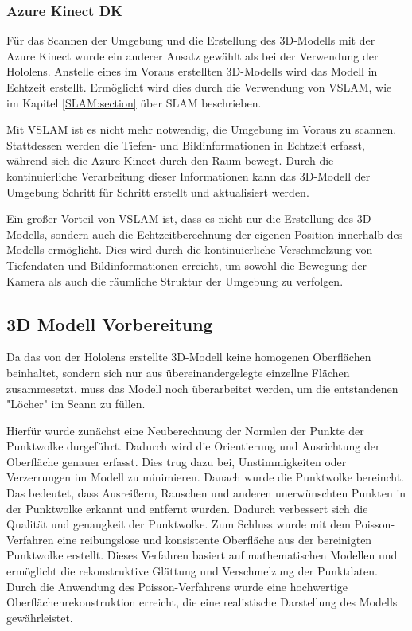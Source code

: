         \subsubsection{Azure Kinect \ac{DK}} \label{kinect:subsubsection}
        Für das Scannen der Umgebung und die Erstellung des 3D-Modells mit der Azure Kinect wurde ein anderer Ansatz gewählt als bei der Verwendung der Hololens. Anstelle eines im Voraus erstellten 3D-Modells wird das Modell in Echtzeit erstellt. Ermöglicht wird dies durch die Verwendung von \ac{VSLAM}, wie im Kapitel \ref{SLAM:section} über \ac{SLAM} beschrieben.

        Mit \ac{VSLAM} ist es nicht mehr notwendig, die Umgebung im Voraus zu scannen. Stattdessen werden die Tiefen- und Bildinformationen in Echtzeit erfasst, während sich die Azure Kinect durch den Raum bewegt. Durch die kontinuierliche Verarbeitung dieser Informationen kann das 3D-Modell der Umgebung Schritt für Schritt erstellt und aktualisiert werden.

        Ein großer Vorteil von \ac{VSLAM} ist, dass es nicht nur die Erstellung des 3D-Modells, sondern auch die Echtzeitberechnung der eigenen Position innerhalb des Modells ermöglicht. Dies wird durch die kontinuierliche Verschmelzung von Tiefendaten und Bildinformationen erreicht, um sowohl die Bewegung der Kamera als auch die räumliche Struktur der Umgebung zu verfolgen.

    \subsection{3D Modell Vorbereitung} \label{3d_modell_vorbereitung:subsection}
    Da das von der Hololens erstellte 3D-Modell keine homogenen Oberflächen beinhaltet, sondern sich nur aus übereinandergelegte einzellne Flächen zusammesetzt, muss das Modell noch überarbeitet werden, um die entstandenen "Löcher" im Scann zu füllen.
    
    Hierfür wurde zunächst eine Neuberechnung der Normlen der Punkte der Punktwolke durgeführt. Dadurch wird die Orientierung und Ausrichtung der Oberfläche genauer erfasst. Dies trug dazu bei, Unstimmigkeiten oder Verzerrungen im Modell zu minimieren. Danach wurde die Punktwolke bereincht. Das bedeutet, dass Ausreißern, Rauschen und anderen unerwünschten Punkten in der Punktwolke erkannt und entfernt wurden. Dadurch verbessert sich die Qualität und genaugkeit der Punktwolke. Zum Schluss wurde mit dem Poisson-Verfahren eine reibungslose und konsistente Oberfläche aus der bereinigten Punktwolke erstellt. Dieses Verfahren basiert auf mathematischen Modellen und ermöglicht die rekonstruktive Glättung und Verschmelzung der Punktdaten. Durch die Anwendung des Poisson-Verfahrens wurde eine hochwertige Oberflächenrekonstruktion erreicht, die eine realistische Darstellung des Modells gewährleistet.

